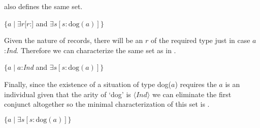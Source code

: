 \nexteg{} also defines the same set.
\begin{ex} 
$\{a\mid\exists
  r[r$:] and 
$\exists s [s:\text{dog}(a)]\}$ 
\end{ex} 
Given the nature of records, there will be an $r$ of the required type
just in case $a$:\textit{Ind}.  Therefore we can characterize the same set
as in \nexteg{}.
\begin{ex} 
$\{a\mid a$:\textit{Ind} and 
$\exists s [s:\text{dog}(a)]\}$ 
\end{ex} 
Finally, since the existence of a situation of type dog($a$) requires
the $a$ is an individual given that the arity of `dog' is
$\langle\textit{Ind}\rangle$ we can eliminate the first conjunct
altogether so the minimal characterization of this set is \nexteg{}.
\begin{ex} 
$\{a\mid  
\exists s [s:\text{dog}(a)]\}$  
\end{ex} 
       
   
   
  

